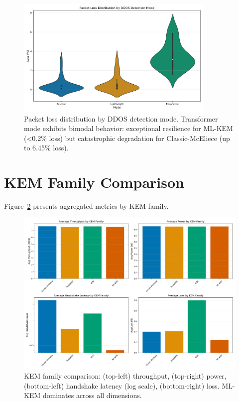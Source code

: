 \documentclass[11pt,a4paper]{article}
\begin{document}
\begin{figure}[H]
\centering
\includegraphics[width=0.85\textwidth]{../figures/figure05_loss_distribution_violin.png}
\caption{Packet loss distribution by DDOS detection mode. Transformer mode exhibits bimodal behavior: exceptional resilience for ML-KEM (<0.2\% loss) but catastrophic degradation for Classic-McEliece (up to 6.45\% loss).}
\label{fig:loss_violin}
\end{figure}

\section{KEM Family Comparison}

Figure~\ref{fig:kem_comparison} presents aggregated metrics by KEM family.

\begin{figure}[H]
\centering
\includegraphics[width=\textwidth]{../figures/figure15_kem_family_comparison_bars.png}
\caption{KEM family comparison: (top-left) throughput, (top-right) power, (bottom-left) handshake latency (log scale), (bottom-right) loss. ML-KEM dominates across all dimensions.}
\label{fig:kem_comparison}
\end{figure}
\end{document}
